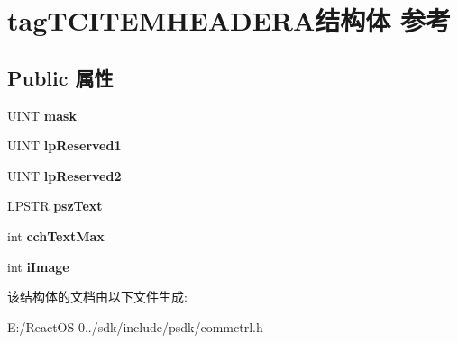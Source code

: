 \hypertarget{structtag_t_c_i_t_e_m_h_e_a_d_e_r_a}{}\section{tag\+T\+C\+I\+T\+E\+M\+H\+E\+A\+D\+E\+R\+A结构体 参考}
\label{structtag_t_c_i_t_e_m_h_e_a_d_e_r_a}
\subsection*{Public 属性}
\begin{DoxyCompactItemize}
\item 
\mbox{\label{structtag_t_c_i_t_e_m_h_e_a_d_e_r_a_ab211287f1c74f908b35d1901c51d5d08}} 
U\+I\+NT {\bfseries mask}
\item 
\mbox{\label{structtag_t_c_i_t_e_m_h_e_a_d_e_r_a_a04c3544092f0bc28950bfef5037d53b2}} 
U\+I\+NT {\bfseries lp\+Reserved1}
\item 
\mbox{\label{structtag_t_c_i_t_e_m_h_e_a_d_e_r_a_a173f55ad7338c45f168cd81573a4f6c1}} 
U\+I\+NT {\bfseries lp\+Reserved2}
\item 
\mbox{\label{structtag_t_c_i_t_e_m_h_e_a_d_e_r_a_a28cd278299e3f42e272f8705d7480f05}} 
L\+P\+S\+TR {\bfseries psz\+Text}
\item 
\mbox{\label{structtag_t_c_i_t_e_m_h_e_a_d_e_r_a_ae6c0789b342e2a6320aa2bc974118038}} 
int {\bfseries cch\+Text\+Max}
\item 
\mbox{\label{structtag_t_c_i_t_e_m_h_e_a_d_e_r_a_aa04d7edbcefefe677afef0682f45306b}} 
int {\bfseries i\+Image}
\end{DoxyCompactItemize}


该结构体的文档由以下文件生成\+:\begin{DoxyCompactItemize}
\item 
E\+:/\+React\+O\+S-\/0../sdk/include/psdk/commctrl.\+h\end{DoxyCompactItemize}
